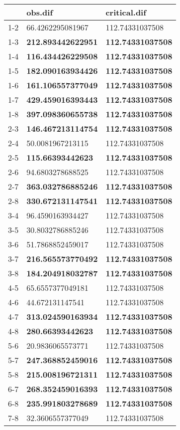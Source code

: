 \begin{table}[ht]
\centering
\begin{tabular}{rll}
  \hline
 & obs.dif & critical.dif \\ 
  \hline
1-2 & 66.4262295081967 & 112.74331037508 \\ 
  1-3 & \textbf{212.893442622951} & \textbf{112.74331037508} \\ 
  1-4 & \textbf{116.434426229508} & \textbf{112.74331037508} \\ 
  1-5 & \textbf{182.090163934426} & \textbf{112.74331037508} \\ 
  1-6 & \textbf{161.106557377049} & \textbf{112.74331037508} \\ 
  1-7 & \textbf{429.459016393443} & \textbf{112.74331037508} \\ 
  1-8 & \textbf{397.098360655738} & \textbf{112.74331037508} \\ 
  2-3 & \textbf{146.467213114754} & \textbf{112.74331037508} \\ 
  2-4 & 50.0081967213115 & 112.74331037508 \\ 
  2-5 & \textbf{115.66393442623} & \textbf{112.74331037508} \\ 
  2-6 & 94.6803278688525 & 112.74331037508 \\ 
  2-7 & \textbf{363.032786885246} & \textbf{112.74331037508} \\ 
  2-8 & \textbf{330.672131147541} & \textbf{112.74331037508} \\ 
  3-4 & 96.4590163934427 & 112.74331037508 \\ 
  3-5 & 30.8032786885246 & 112.74331037508 \\ 
  3-6 & 51.7868852459017 & 112.74331037508 \\ 
  3-7 & \textbf{216.565573770492} & \textbf{112.74331037508} \\ 
  3-8 & \textbf{184.204918032787} & \textbf{112.74331037508} \\ 
  4-5 & 65.6557377049181 & 112.74331037508 \\ 
  4-6 & 44.672131147541 & 112.74331037508 \\ 
  4-7 & \textbf{313.024590163934} & \textbf{112.74331037508} \\ 
  4-8 & \textbf{280.66393442623} & \textbf{112.74331037508} \\ 
  5-6 & 20.9836065573771 & 112.74331037508 \\ 
  5-7 & \textbf{247.368852459016} & \textbf{112.74331037508} \\ 
  5-8 & \textbf{215.008196721311} & \textbf{112.74331037508} \\ 
  6-7 & \textbf{268.352459016393} & \textbf{112.74331037508} \\ 
  6-8 & \textbf{235.991803278689} & \textbf{112.74331037508} \\ 
  7-8 & 32.3606557377049 & 112.74331037508 \\ 
   \hline
\end{tabular}
\end{table}

